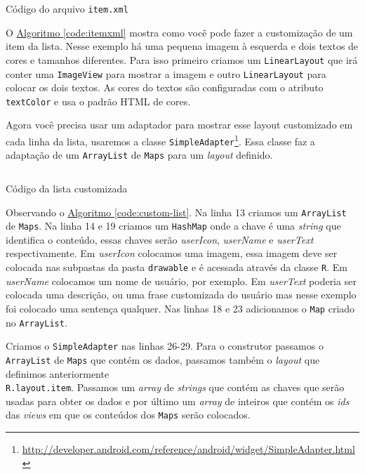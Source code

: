 \documentclass[a4paper,12pt,brazil,oneside]{book}
\begin{document}
\begin{listing}[H]
\inputminted[linenos=true,fontsize=\small,frame=lines, framesep=2mm, tabsize=2,numbersep=5pt]{xml}{src/design/item.xml}
\caption{Código do arquivo \texttt{item.xml}}
\label{code:itemxml}
\end{listing}	

O \hyperref[code:itemxml]{Algoritmo \ref*{code:itemxml}} mostra como você pode fazer a customização de um item da lista. Nesse exemplo há uma pequena imagem à esquerda e dois textos de cores e tamanhos diferentes. 
Para isso primeiro criamos um \texttt{LinearLayout} que irá conter uma \texttt{ImageView} para mostrar a imagem e outro \texttt{LinearLayout} para colocar os dois textos. As cores do textos são configuradas com o atributo \texttt{textColor} e usa o padrão HTML de cores.

Agora você precisa usar um adaptador para mostrar esse layout customizado em cada linha da lista, usaremos a classe \texttt{SimpleAdapter}\footnote{\href{http://developer.android.com/reference/android/widget/SimpleAdapter.html}{http://developer.android.com/reference/android/widget/SimpleAdapter.html}}. Essa classe faz a adaptação de um \texttt{ArrayList} de \texttt{Maps} para um \emph{layout} definido. 

\begin{listing}[H]
\inputminted[linenos=true,fontsize=\small,frame=lines, framesep=2mm, tabsize=2,numbersep=5pt]{java}{src/design/customlist.java}
\caption{Código da lista customizada}
\label{code:custom-list}
\end{listing}	

Observando o \hyperref[code:custom-list]{Algoritmo \ref*{code:custom-list}}. Na linha 13 criamos um \texttt{ArrayList} de \texttt{Maps}. Na linha 14 e 19 criamos um \texttt{HashMap} onde a chave é uma \emph{string} que identifica o conteúdo, essas chaves serão \emph{userIcon}, \emph{userName} e \emph{userText} respectivamente. Em \emph{userIcon} colocamos uma imagem, essa imagem deve ser colocada nas subpastas da pasta \texttt{drawable} e é acessada através da classe \texttt{R}. Em \emph{userName} colocamos um nome de usuário, por exemplo. Em \emph{userText} poderia ser colocada uma descrição, ou uma frase customizada do usuário mas nesse exemplo foi colocado uma sentença qualquer. Nas linhas 18 e 23 adicionamos o \texttt{Map} criado no \texttt{ArrayList}.

Criamos o \texttt{SimpleAdapter} nas linhas 26-29. Para o construtor passamos o \texttt{ArrayList} de \texttt{Maps} que contém os dados, passamos também o \emph{layout} que definimos anteriormente \\ \texttt{R.layout.item}. Passamos um \emph{array} de \emph{strings} que contém as chaves que serão usadas para obter os dados e por último um \emph{array} de inteiros que contém os \emph{ids} das \emph{views} em que os conteúdos dos \texttt{Maps} serão colocados.
\end{document}
